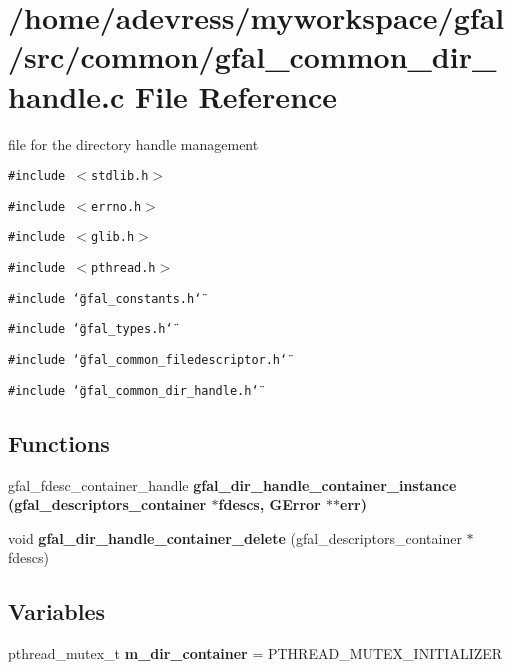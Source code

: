 \section{/home/adevress/myworkspace/gfal/src/common/gfal\_\-common\_\-dir\_\-handle.c File Reference}
\label{gfal__common__dir__handle_8c}
file for the directory handle management 

{\tt \#include $<$stdlib.h$>$}\par
{\tt \#include $<$errno.h$>$}\par
{\tt \#include $<$glib.h$>$}\par
{\tt \#include $<$pthread.h$>$}\par
{\tt \#include \char`\"{}gfal\_\-constants.h\char`\"{}}\par
{\tt \#include \char`\"{}gfal\_\-types.h\char`\"{}}\par
{\tt \#include \char`\"{}gfal\_\-common\_\-filedescriptor.h\char`\"{}}\par
{\tt \#include \char`\"{}gfal\_\-common\_\-dir\_\-handle.h\char`\"{}}\par
\subsection*{Functions}
\begin{CompactItemize}
\item 
gfal\_\-fdesc\_\-container\_\-handle \bf{gfal\_\-dir\_\-handle\_\-container\_\-instance} (gfal\_\-descriptors\_\-container $\ast$fdescs, GError $\ast$$\ast$err)
\item 
void \textbf{gfal\_\-dir\_\-handle\_\-container\_\-delete} (gfal\_\-descriptors\_\-container $\ast$fdescs)\label{gfal__common__dir__handle_8c_266f240b644154dade8bdb39e4c20efc}

\end{CompactItemize}
\subsection*{Variables}
\begin{CompactItemize}
\item 
pthread\_\-mutex\_\-t \textbf{m\_\-dir\_\-container} = PTHREAD\_\-MUTEX\_\-INITIALIZER\label{gfal__common__dir__handle_8c_4cfbc4b2dd6aa3816f19a63d2c0932ca}

\end{CompactItemize}


